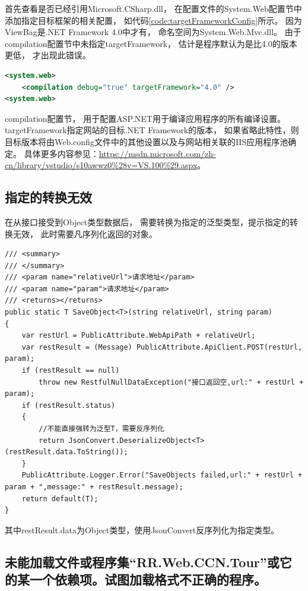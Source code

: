 \documentclass{book}
\begin{document}
首先查看是否已经引用Microsoft.CSharp.dll，
在配置文件的System.Web配置节中添加指定目标框架的相关配置，
如代码\ref{code:targetFrameworkConfig}所示。
因为ViewBag是.NET Framework 4.0中才有，
命名空间为System.Web.Mvc.dll。
由于compilation配置节中未指定targetFramework，
估计是程序默认为是比4.0的版本更低，
才出现此错误。

\begin{lstlisting}[language=XML,caption=配置MVC目标框架,label={code:targetFrameworkConfig}]
<system.web>
	<compilation debug="true" targetFramework="4.0" />
<system.web>
\end{lstlisting}

compilation配置节，
用于配置ASP.NET用于编译应用程序的所有编译设置。
targetFramework指定网站的目标.NET Framework的版本，
如果省略此特性，则目标版本将由Web.config文件中的其他设置以及与网站相关联的IIS应用程序池确定。
具体更多内容参见：\url{https://msdn.microsoft.com/zh-cn/library/vstudio/s10awwz0\%28v=VS.100\%29.aspx}。

\subsection{指定的转换无效}

在从接口接受到Object类型数据后，
需要转换为指定的泛型类型，提示指定的转换无效，
此时需要凡序列化返回的对象。

\begin{lstlisting}[language={[Sharp]C}]
/// <summary>
/// </summary>
/// <param name="relativeUrl">请求地址</param>
/// <param name="param">请求地址</param>
/// <returns></returns>
public static T SaveObject<T>(string relativeUrl, string param)
{
    var restUrl = PublicAttribute.WebApiPath + relativeUrl;
    var restResult = (Message) PublicAttribute.ApiClient.POST(restUrl, param);
    if (restResult == null)
        throw new RestfulNullDataException("接口返回空,url:" + restUrl + param);
    if (restResult.status)
    {
    	//不能直接强转为泛型T，需要反序列化
        return JsonConvert.DeserializeObject<T>(restResult.data.ToString());
    }
    PublicAttribute.Logger.Error("SaveObjects failed,url:" + restUrl + param + ",message:" + restResult.message);
    return default(T);
}
\end{lstlisting}

其中restResult.data为Object类型，使用JsonConvert反序列化为指定类型。

\subsection{未能加载文件或程序集“RR.Web.CCN.Tour”或它的某一个依赖项。试图加载格式不正确的程序。}
\end{document}
